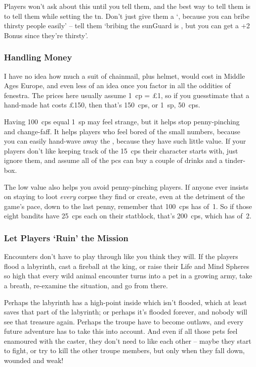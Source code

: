 \begin{multicols}{2}
Players won't ask about this until you tell them, and the best way to tell them is to tell them while setting the \gls{tn}.
Don't just give them a `\tn[8], because you can bribe thirsty people easily' -- tell them `bribing the \gls{sunGuard} is \tn[10], but you can get a +2 Bonus since they're thirsty'.

\subsubsection{Handling Money}
I have no idea how much a suit of chainmail, plus helmet, would cost in Middle Ages Europe, and even less of an idea once you factor in all the oddities of \gls{fenestra}.
The prices here usually assume 1~\gls{cp} = \pounds1, so if you guesstimate that a hand-made hat costs \pounds150, then that's 150~\glspl{cp}, or 1~\gls{sp}, 50~\glspl{cp}.

Having 100~\glspl{cp} equal 1~\gls{sp} may feel strange, but it helps stop penny-pinching and change-faff.
It helps players who feel bored of the small numbers, because you can easily hand-wave away the , because they have such little value.
If your players don't like keeping track of the 15~\glspl{cp} their character starts with, just ignore them, and assume all of the \glspl{pc} can buy a couple of drinks and a tinder-box.

The low value also helps you avoid penny-pinching players.
If anyone ever insists on staying to loot \emph{every} corpse they find or create, even at the detriment of the game's pace, down to the last penny, remember that 100~\glspl{cp} has  of~1.
So if those eight bandits have 25~\glspl{cp} each on their statblock, that's 200~\glspl{cp}, which has  of~2.

\subsubsection{Let Players `Ruin' the Mission}

Encounters don't have to play through like you think they will.
If the players flood a labyrinth, cast a fireball at the king, or raise their Life and Mind Spheres so high that every wild animal encounter turns into a pet in a growing army, take a breath, re-examine the situation, and go from there.

Perhaps the labyrinth has a high-point inside which isn't flooded, which at least saves that part of the labyrinth; or perhaps it's flooded forever, and nobody will see that treasure again.
Perhaps the troupe have to become outlaws, and every future adventure has to take this into account.
And even if all those pets feel enamoured with the caster, they don't need to like each other -- maybe they start to fight, or try to kill the other troupe members, but only when they fall down, wounded and weak!


\end{multicols}
